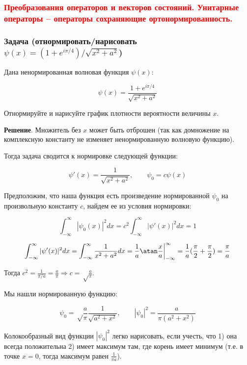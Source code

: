 \subsubsection{\textcolor{red}{Преобразования операторов и векторов состояний. Унитарные операторы – операторы сохраняющие ортонормированность.}}


\subsubsection{Задача (отнормировать/нарисовать $\psi(x)=({1+e^{i\pi/4}})/{\sqrt{x^2+a^2}}$)}\hypertarget{section-3}{}\label{section-3}

Дана ненормированная волновая функция $\psi(x)$:

\begin{displaymath}
\psi(x)=\frac{1+e^{i\pi/4}}{\sqrt{x^2+a^2}}
\end{displaymath}

Отнормируйте и нарисуйте график плотности вероятности величины $x$.

\textbf{Решение}. Множитель без \guillemotleft{}$x$\guillemotright{} может быть отброшен (так как домножение на комплексную константу не изменяет ненормированную волновую функцию). 

Тогда задача сводится к нормировке следующей функции:

\begin{displaymath}
\psi'(x)=\frac{1}{\sqrt{x^2+a^2}},\qquad \psi_0=c\psi(x)
\end{displaymath}

Предположим, что наша функция есть произведение нормированной $\psi_0$ на произвольную константу $c$, найдем ее из условия нормировки:

\begin{displaymath}
\int_{-\infty}^{\infty}|\psi_0(x)|^2 dx=
c^2\int_{-\infty}^{\infty}|\psi'(x)|^2 dx=1
\end{displaymath}

\begin{displaymath}
\int_{-\infty}^{\infty}|\psi'(x)|^2 dx=
\int_{-\infty}^{\infty} \frac{1}{x^2+a^2} dx= \frac{1}{a}\atan\frac{x}{a}\bigg|_{-\infty}^{\infty}=
\frac{1}{a}(\frac\pi2+\frac\pi2)=\frac{\pi}{a}
\end{displaymath}

Тогда  $c^2=\frac{1}{\pi/a}=\frac{a}{\pi} \Rightarrow c=\sqrt\frac{a}{\pi}$.

Мы нашли нормированную функцию:

\begin{displaymath}
\psi_0=\sqrt\frac{a}{\pi}\frac{1}{\sqrt{a^2+x^2}},\qquad
|\psi_0|^2=\frac{a}{\pi(a^2+x^2)}
\end{displaymath}

Колокообразный вид функции $|\psi_0|^2$ легко нарисовать,  если учесть, что 1) она всегда положительна 2) имеет максимум там, где корень имеет минимум (т.е. в точке $x=0$, тогда максимум равен $\frac{1}{\pi a}$).

